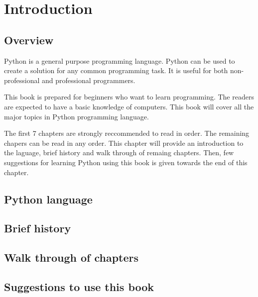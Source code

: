 \cleardoublepage
{}
{}
\chapter*{Introduction}

\section{Overview}

Python is a general purpose programming language.  Python can be used
to create a solution for any common programming task.  It is useful
for both non-professional and professional programmers.

This book is prepared for beginners who want to learn programming.
The readers are expected to have a basic knowledge of computers.  This
book will cover all the major topics in Python programming language.

The first 7 chapters are strongly reccommended to read in order.  The
remaining chapers can be read in any order.  This chapter will provide
an introduction to the laguage, brief history and walk through of
remaing chapters.  Then, few suggestions for learning Python using
this book is given towards the end of this chapter.

\newpage
\section{Python language}

\newpage
\section{Brief history}

\newpage
\section{Walk through of chapters}

\newpage
\section{Suggestions to use this book}
